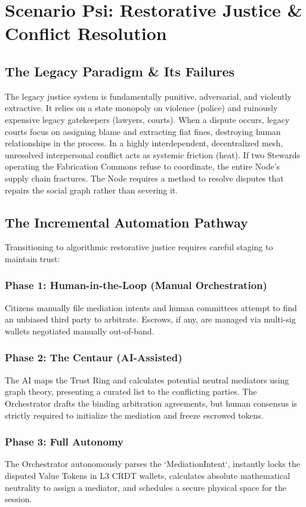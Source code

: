 \chapter{Scenario Psi: Restorative Justice \& Conflict Resolution}

\section{The Legacy Paradigm \& Its Failures}
The legacy justice system is fundamentally punitive, adversarial, and violently extractive. It relies on a state monopoly on violence (police) and ruinously expensive legacy gatekeepers (lawyers, courts). When a dispute occurs, legacy courts focus on assigning blame and extracting fiat fines, destroying human relationships in the process. In a highly interdependent, decentralized mesh, unresolved interpersonal conflict acts as systemic friction (heat). If two Stewards operating the Fabrication Commons refuse to coordinate, the entire Node's supply chain fractures. The Node requires a method to resolve disputes that repairs the social graph rather than severing it.

\section{The Incremental Automation Pathway}
Transitioning to algorithmic restorative justice requires careful staging to maintain trust:

\subsection{Phase 1: Human-in-the-Loop (Manual Orchestration)}
Citizens manually file mediation intents and human committees attempt to find an unbiased third party to arbitrate. Escrows, if any, are managed via multi-sig wallets negotiated manually out-of-band.

\subsection{Phase 2: The Centaur (AI-Assisted)}
The AI maps the Trust Ring and calculates potential neutral mediators using graph theory, presenting a curated list to the conflicting parties. The Orchestrator drafts the binding arbitration agreements, but human consensus is strictly required to initialize the mediation and freeze escrowed tokens.

\subsection{Phase 3: Full Autonomy}
The Orchestrator autonomously parses the `MediationIntent`, instantly locks the disputed Value Tokens in L3 CRDT wallets, calculates absolute mathematical neutrality to assign a mediator, and schedules a secure physical space for the session.

